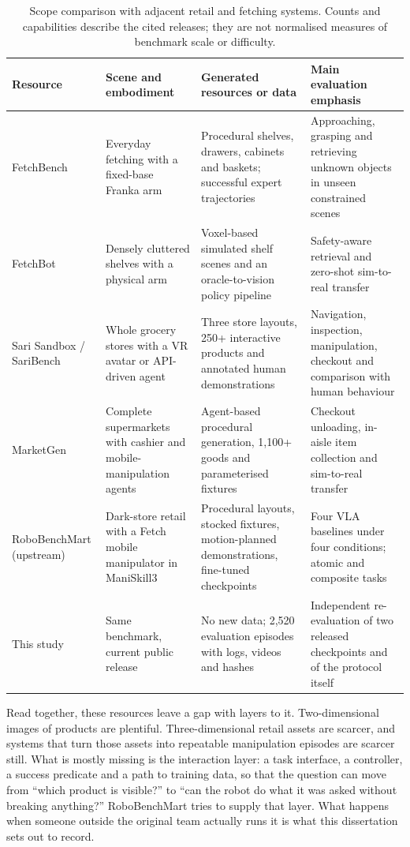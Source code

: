 {\renewcommand{\arraystretch}{1.14}
\begin{table}[H]
\centering
\footnotesize
\begin{tabularx}{\textwidth}{
>{\RaggedRight\arraybackslash}p{}
>{\RaggedRight\arraybackslash}p{}
>{\RaggedRight\arraybackslash}X
>{\RaggedRight\arraybackslash}X}
\toprule
Resource & Scene and embodiment & Generated resources or data & Main evaluation emphasis \\
\midrule
FetchBench & Everyday fetching with a fixed-base Franka arm & Procedural shelves, drawers, cabinets and baskets; successful expert trajectories & Approaching, grasping and retrieving unknown objects in unseen constrained scenes \\
FetchBot & Densely cluttered shelves with a physical arm & Voxel-based simulated shelf scenes and an oracle-to-vision policy pipeline & Safety-aware retrieval and zero-shot sim-to-real transfer \\
Sari Sandbox / SariBench & Whole grocery stores with a VR avatar or API-driven agent & Three store layouts, 250+ interactive products and annotated human demonstrations & Navigation, inspection, manipulation, checkout and comparison with human behaviour \\
MarketGen & Complete supermarkets with cashier and mobile-manipulation agents & Agent-based procedural generation, 1,100+ goods and parameterised fixtures & Checkout unloading, in-aisle item collection and sim-to-real transfer \\
RoboBenchMart (upstream) & Dark-store retail with a Fetch mobile manipulator in ManiSkill3 & Procedural layouts, stocked fixtures, motion-planned demonstrations, fine-tuned checkpoints & Four VLA baselines under four conditions; atomic and composite tasks \\
This study & Same benchmark, current public release & No new data; 2,520 evaluation episodes with logs, videos and hashes & Independent re-evaluation of two released checkpoints and of the protocol itself \\
\bottomrule
\end{tabularx}
\caption{Scope comparison with adjacent retail and fetching systems. Counts and capabilities describe the cited releases; they are not normalised measures of benchmark scale or difficulty.}
\label{tab:retail-benchmark-comparison}
\end{table}}

Read together, these resources leave a gap with layers to it. Two-dimensional images of products are plentiful. Three-dimensional retail assets are scarcer, and systems that turn those assets into repeatable manipulation episodes are scarcer still. What is mostly missing is the interaction layer: a task interface, a controller, a success predicate and a path to training data, so that the question can move from ``which product is visible?'' to ``can the robot do what it was asked without breaking anything?'' RoboBenchMart tries to supply that layer. What happens when someone outside the original team actually runs it is what this dissertation sets out to record.

